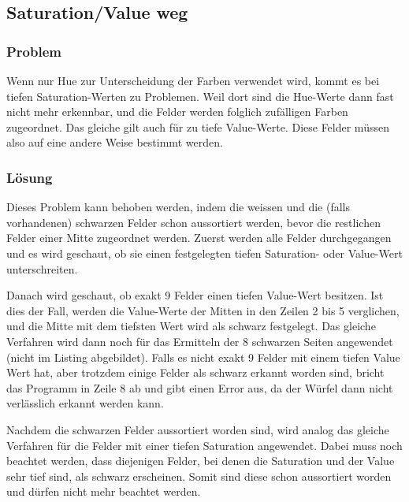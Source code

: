 \documentclass[a4paper, 12pt]{article}
\begin{document}
\subsection{Saturation/Value weg}
\subsubsection{Problem}
Wenn nur Hue zur Unterscheidung der Farben verwendet wird, kommt es bei tiefen Saturation-Werten zu Problemen. Weil dort sind die Hue-Werte dann fast nicht mehr erkennbar, und die Felder werden folglich zufälligen Farben zugeordnet. Das gleiche gilt auch für zu tiefe Value-Werte. Diese Felder müssen also auf eine andere Weise bestimmt werden. 
\subsubsection{Lösung}
Dieses Problem kann behoben werden, indem die weissen und die (falls vorhandenen) schwarzen Felder schon aussortiert werden, bevor die restlichen Felder einer Mitte zugeordnet werden. Zuerst werden alle Felder durchgegangen und es wird geschaut, ob sie einen festgelegten tiefen Saturation- oder Value-Wert unterschreiten.

Danach wird geschaut, ob exakt 9 Felder einen tiefen Value-Wert besitzen. Ist dies der Fall, werden die Value-Werte der Mitten in den Zeilen 2 bis 5 verglichen, und die Mitte mit dem tiefsten Wert wird als schwarz festgelegt. Das gleiche Verfahren wird dann noch für das Ermitteln der 8 schwarzen Seiten angewendet (nicht im Listing abgebildet). Falls es nicht exakt 9 Felder mit einem tiefen Value Wert hat, aber trotzdem einige Felder als schwarz erkannt worden sind, bricht das Programm in Zeile 8 ab und gibt einen Error aus, da der Würfel dann nicht verlässlich erkannt werden kann. 

 Nachdem die schwarzen Felder aussortiert worden sind, wird analog das gleiche Verfahren für die Felder mit einer tiefen Saturation angewendet. Dabei muss noch beachtet werden, dass diejenigen Felder, bei denen die Saturation und der Value sehr tief sind, als schwarz erscheinen. Somit sind diese schon aussortiert worden und dürfen nicht mehr beachtet werden. 
\end{document}
